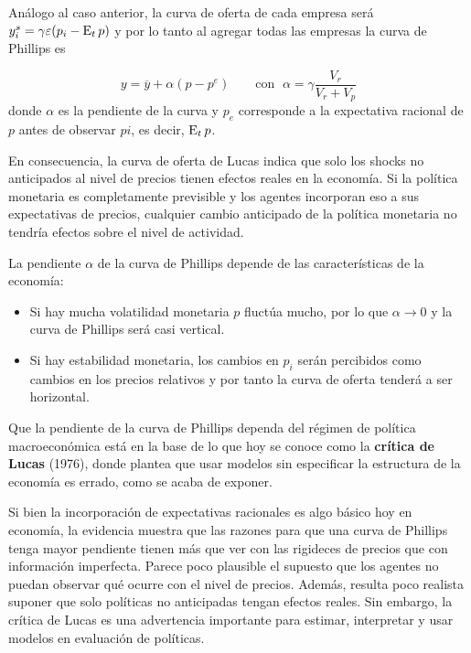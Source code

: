 \documentclass[DeGregorioResumen]{subfiles}
\begin{document}
Análogo al caso anterior, la curva de oferta de cada empresa será $y^s_i=\gamma\varepsilon(p_i-\operatorname{E}_t p)$ y por lo tanto al agregar todas las empresas la curva de Phillips es

\begin{equation}
	y = \overline y + \alpha(p-p^e) \qquad \text{con }\; \alpha = \gamma \frac{V_r}{V_r + V_p}
\end{equation}
donde $\alpha$ es la pendiente de la curva y $p_e$ corresponde a la expectativa racional de $p$ antes de observar $pi$, es decir, $\operatorname{E}_t p$.

En consecuencia, la curva de oferta de Lucas indica que solo los shocks no anticipados al nivel de precios tienen efectos reales en la economía. Si la política monetaria es completamente previsible y los agentes incorporan eso a sus expectativas de precios, cualquier cambio anticipado de la política monetaria no tendría efectos sobre el nivel de actividad.

La pendiente $\alpha$ de la curva de Phillips depende de las características de la economía:

\begin{itemize}
	\item Si hay mucha volatilidad monetaria $p$ fluctúa mucho, por lo que $\alpha \rightarrow 0$ y la curva de Phillips será casi vertical.
	\item Si hay estabilidad monetaria, los cambios en $p_i$ serán percibidos como cambios en los precios relativos y por tanto la curva de oferta tenderá a ser horizontal.
\end{itemize}

Que la pendiente de la curva de Phillips dependa del régimen de política macroeconómica está en la base de lo que hoy se conoce como la \textbf{crítica de Lucas} (1976), donde plantea que usar modelos sin especificar la estructura de la economía es errado, como se acaba de exponer.

Si bien la incorporación de expectativas racionales es algo básico hoy en economía, la evidencia muestra que las razones para que una curva de Phillips tenga mayor pendiente tienen más que ver con las rigideces de precios que con información imperfecta. Parece poco plausible el supuesto que los agentes no puedan observar qué ocurre con el nivel de precios. Además, resulta poco realista suponer que solo políticas no anticipadas tengan efectos reales. Sin embargo, la crítica de Lucas es una advertencia importante para estimar, interpretar y usar modelos en evaluación de políticas.
\end{document}
